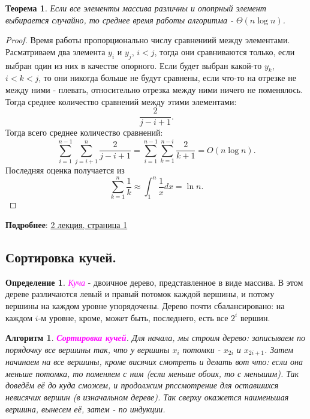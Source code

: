 \documentclass[a4paper]{article}
\theoremstyle{indented}
\newtheorem{theorem}{Теорема}
\newtheorem{alg}{Алгоритм}
\theoremstyle{definition}
\newtheorem{defn}{Определение}
\theoremstyle{remark}
\begin{document}
\begin{theorem}
    Если все элементы массива различны и опопрный элемент выбирается случайно, то среднее время работы алгоритма - $\Theta(n\log n)$.
\end{theorem}

\begin{proof}
    Время работы пропорционально числу сравнениий между элементами. Расматриваем два элемента $y_i$ и $y_j$, $i<j$, тогда они сравниваются только, если выбран один из них в качестве опорного. Если будет выбран какой-то $y_k$, $i<k<j$, то они никогда больше не будут сравнены, если что-то на отрезке не между ними - плевать, относительно отрезка между ними ничего не поменялось. Тогда среднее количество сравнений между этими элементами: 
    \[
        \frac{2}{j-i+1}. 
    \]
    Тогда всего среднее количество сравнений: 
    \[
        \sum_{i=1}^{n-1}\sum_{j=i+1}^n \frac{2}{j-i+1} = \sum_{i=1}^{n-1}\sum_{k=1}^{n-i} \frac{2}{k+1}= O(n\log n).
    \]
    Последняя оценка получается из
    \[
        \sum_{k=1}^n\frac{1}{k} \approx \int_1^n \frac{1}{x}dx = \ln n. 
    \]
\end{proof}

\textbf{Подробнее}: \href{https://users.math-cs.spbu.ru/~okhotin/teaching/algorithms_2020/okhotin_algorithms_2020_l2.pdf}{2 лекция, страница 1}

\subsection{Сортировка кучей.}

\begin{defn}
    \textcolor{magenta}{\hypertarget{d1.5}{\textit{Куча}}} - двоичное дерево, представленное в виде массива. В этом дереве различаются левый и правый потомок каждой вершины, и потому вершины на каждом уровне упорядочены. Дерево почти сбалансировано: на каждом $i$-м уровне, кроме, может быть, последнего, есть все $2^i$ вершин.
\end{defn}

\begin{alg}
    \textcolor{magenta}{\hypertarget{t2}{\textbf{Сортировка кучей}}}. Для начала, мы строим дерево: записываем по порядочку все вершины так, что у вершины $x_i$ потомки - $x_{2i}$ и $x_{2i+1}$. Затем начинаем на все вершины, кроме висячих смотреть и делать вот что: если она меньше потомка, то поменяем с ним (если меньше обоих, то с меньшим). Так доведём её до куда сможем, и продолжим рпссмотрение для оставшихся невисячих вершин (в изначальном дереве). Так сверху окажется наименьшая вершина, вынесем её, затем - по индукции.
\end{alg}
\end{document}
